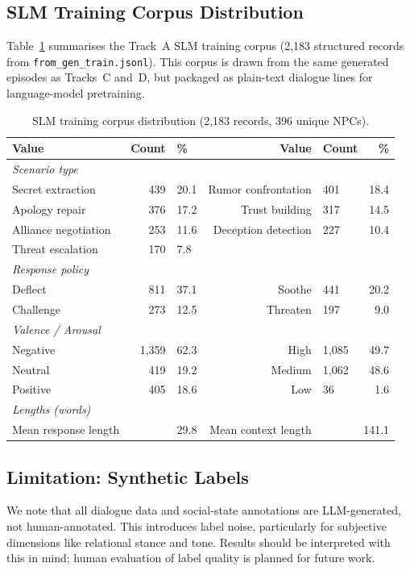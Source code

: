 \documentclass[11pt]{article}
\begin{document}
\subsection{SLM Training Corpus Distribution}

Table~\ref{tab:slm_dist} summarises the Track~A SLM training corpus (2,183 structured records from \texttt{from\_gen\_train.jsonl}).
This corpus is drawn from the same generated episodes as Tracks~C and~D, but packaged as plain-text dialogue lines for language-model pretraining.

\begin{table}[h]
\centering
\caption{SLM training corpus distribution (2,183 records, 396 unique NPCs).}
\label{tab:slm_dist}
\small
\begin{tabular}{@{}lrlrlr@{}}
\toprule
\textbf{Value} & \textbf{Count} & \textbf{\%} & \textbf{Value} & \textbf{Count} & \textbf{\%} \\
\midrule
\multicolumn{6}{l}{\textit{Scenario type}} \\
Secret extraction    & 439 & 20.1 & Rumor confrontation & 401 & 18.4 \\
Apology repair       & 376 & 17.2 & Trust building      & 317 & 14.5 \\
Alliance negotiation & 253 & 11.6 & Deception detection & 227 & 10.4 \\
Threat escalation    & 170 &  7.8 & & & \\
\midrule
\multicolumn{6}{l}{\textit{Response policy}} \\
Deflect   & 811 & 37.1 & Soothe     & 441 & 20.2 \\
Challenge & 273 & 12.5 & Threaten & 197 &  9.0 \\
\midrule
\multicolumn{6}{l}{\textit{Valence / Arousal}} \\
Negative  & 1,359 & 62.3 & High     & 1,085 & 49.7 \\
Neutral   &   419 & 19.2 & Medium   & 1,062 & 48.6 \\
Positive  &   405 & 18.6 & Low      &    36 &  1.6 \\
\midrule
\multicolumn{6}{l}{\textit{Lengths (words)}} \\
Mean response length & \multicolumn{2}{r}{29.8} & Mean context length & \multicolumn{2}{r}{141.1} \\
\bottomrule
\end{tabular}
\end{table}

\subsection{Limitation: Synthetic Labels}
We note that all dialogue data and social-state annotations are LLM-generated, not human-annotated.
This introduces label noise, particularly for subjective dimensions like relational stance and tone.
Results should be interpreted with this in mind; human evaluation of label quality is planned for future work.
\end{document}
